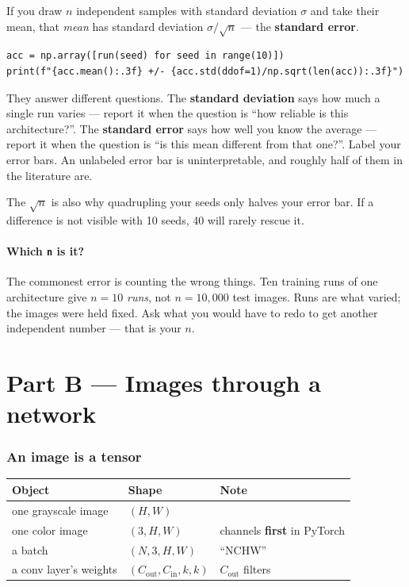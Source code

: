 \documentclass[11pt]{article}
\begin{document}
If you draw $n$ independent samples with standard deviation $\sigma$ and take
their mean, that \emph{mean} has standard deviation $\sigma/\sqrt{n}$ --- the
\textbf{standard error}.

\begin{lstlisting}
acc = np.array([run(seed) for seed in range(10)])
print(f"{acc.mean():.3f} +/- {acc.std(ddof=1)/np.sqrt(len(acc)):.3f}")
\end{lstlisting}

\begin{keybox}
 They answer different questions.
The \textbf{standard deviation} says how much a single run varies --- report it
when the question is ``how reliable is this architecture?''. The \textbf{standard
error} says how well you know the average --- report it when the question is
``is this mean different from that one?''. Label your error bars. An unlabeled
error bar is uninterpretable, and roughly half of them in the literature are.
\end{keybox}

The $\sqrt{n}$ is also why quadrupling your seeds only halves your error bar. If
a difference is not visible with 10 seeds, 40 will rarely rescue it.

\subsection{Which \texttt{n} is it?}

The commonest error is counting the wrong things. Ten training runs of one
architecture give $n = 10$ \emph{runs}, not $n = 10{,}000$ test images. Runs are
what varied; the images were held fixed. Ask what you would have to redo to get
another independent number --- that is your $n$.

\part*{Part B --- Images through a network}

\section{An image is a tensor}

\begin{center}
\begin{tabular}{@{}lll@{}}
\toprule
Object & Shape & Note \\
\midrule
one grayscale image & $(H, W)$ & \\
one color image     & $(3, H, W)$ & channels \textbf{first} in PyTorch \\
a batch             & $(N, 3, H, W)$ & ``NCHW'' \\
a conv layer's weights & $(C_{\text{out}}, C_{\text{in}}, k, k)$ & $C_\text{out}$ filters \\
\bottomrule
\end{tabular}
\end{center}
\end{document}
